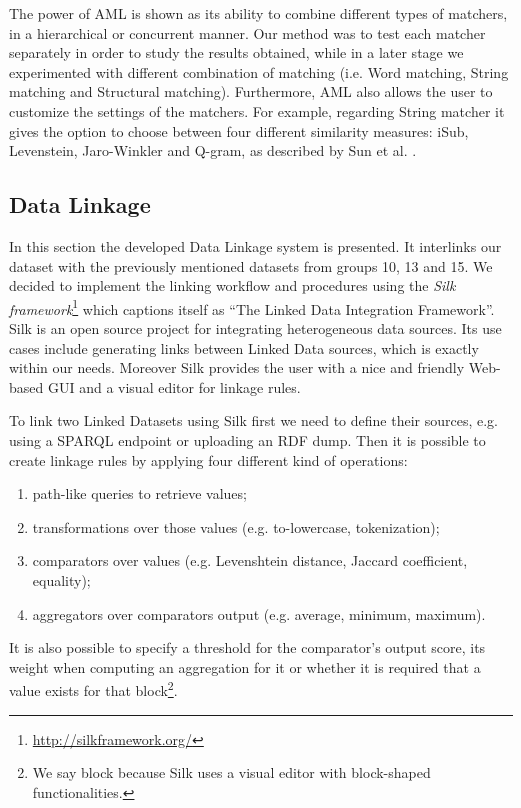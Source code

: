 \documentclass[runningheads,a4paper]{../../StyleFiles/llncs}
\begin{document}
The power of AML is shown as its ability to combine different types of matchers, in a hierarchical or concurrent manner. Our method was to test each matcher separately in order to study the results obtained, while in a later stage we experimented with different combination of matching (i.e. Word matching, String matching and Structural matching). Furthermore, AML also allows the user to customize the settings of the matchers. For example, regarding String matcher it gives the option to choose between four different similarity measures: iSub, Levenstein, Jaro-Winkler and Q-gram, as described by Sun et al. \cite{sun2015comparative}.

\subsection{Data Linkage}
In this section the developed Data Linkage system is presented. It interlinks our dataset with the previously mentioned datasets from groups 10, 13 and 15. We decided to implement the linking workflow and procedures using the \textit{Silk framework}\footnote{\url{http://silkframework.org/}} which captions itself as ``The Linked Data Integration Framework''. Silk is an open source project for integrating heterogeneous data sources. Its use cases include generating links between Linked Data sources, which is exactly within our needs. Moreover Silk provides the user with a nice and friendly Web-based GUI and a visual editor for linkage rules.

To link two Linked Datasets using Silk first we need to define their sources, e.g. using a SPARQL endpoint or uploading an RDF dump. Then it is possible to create linkage rules by applying four different kind of operations:
\begin{enumerate}
	\item path-like queries to retrieve values;
	\item transformations over those values (e.g. to-lowercase, tokenization);
	\item comparators over values (e.g. Levenshtein distance, Jaccard
		coefficient, equality);
	\item aggregators over comparators output (e.g. average, minimum, maximum).
\end{enumerate}
It is also possible to specify a threshold for the comparator's output score, its weight when computing an aggregation for it or whether it is required that a value exists for that block\footnote{We say block because Silk uses a visual editor with block-shaped functionalities.}.
\end{document}
